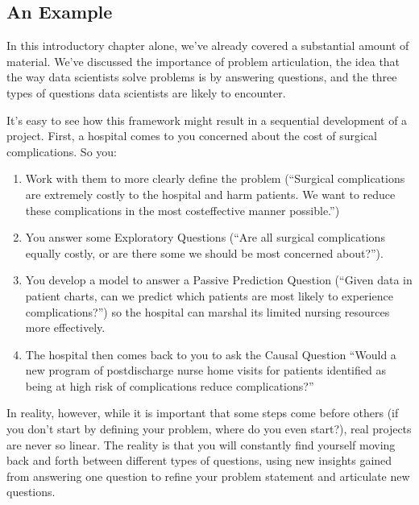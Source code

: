 \documentclass[letterpaper,10pt,english]{jupyterBook}
\begin{document}
\subsection{An Example}
\label{\detokenize{10_introduction/22_question_types:an-example}}
\sphinxAtStartPar
In this introductory chapter alone, we’ve already covered a substantial amount of material. We’ve discussed the importance of problem articulation, the idea that the way data scientists solve problems is by answering questions, and the three types of questions data scientists are likely to encounter.

\sphinxAtStartPar
It’s easy to see how this framework might result in a sequential development of a project. First, a hospital comes to you concerned about the cost of surgical complications. So you:
\begin{enumerate}
%
\item {} 
\sphinxAtStartPar
Work with them to more clearly define the problem (“Surgical complications are extremely costly to the hospital and harm patients. We want to reduce these complications in the most cost\sphinxhyphen{}effective manner possible.”)

\item {} 
\sphinxAtStartPar
You answer some Exploratory Questions (“Are all surgical complications equally costly, or are there some we should be most concerned about?”).

\item {} 
\sphinxAtStartPar
You develop a model to answer a Passive Prediction Question (“Given data in patient charts, can we predict which patients are most likely to experience complications?”) so the hospital can marshal its limited nursing resources more effectively.

\item {} 
\sphinxAtStartPar
The hospital then comes back to you to ask the Causal Question “Would a new program of post\sphinxhyphen{}discharge nurse home visits for patients identified as being at high risk of complications reduce complications?”

\end{enumerate}

\sphinxAtStartPar
In reality, however, while it is important that some steps come before others (if you don’t start by defining your problem, where do you even start?), real projects are never so linear. The reality is that you will constantly find yourself moving back and forth between different types of questions, using new insights gained from answering one question to refine your problem statement and articulate new questions.
\end{document}
